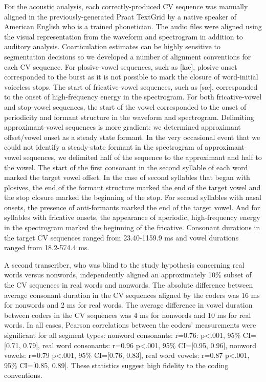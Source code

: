 \documentclass[a4paper,man,natbib,donotrepeattitle, apacite]{apa6}
\begin{document}
For the acoustic analysis, each correctly-produced CV sequence was manually aligned in the previously-generated Praat TextGrid \cite{boersmaPraatDoingPhonetics2018} by a native speaker of American English who is a trained phonetician. The audio files were aligned using the visual representation from the waveform and spectrogram in addition to auditory analysis. Coarticulation estimates can be highly sensitive to segmentation decisions so we developed a number of alignment conventions for each CV sequence. For plosive-vowel sequences, such as [k\ae], plosive onset corresponded to the burst as it is not possible to mark the closure of word-initial voiceless stops. The start of fricative-vowel sequences, such as [s\ae], corresponded to the onset of high-frequency energy in the spectrogram. For both fricative-vowel and stop-vowel sequences, the start of the vowel corresponded to the onset of periodicity and formant structure in the waveform and spectrogram. Delimiting approximant-vowel sequences is more gradient: we determined approximant offset/vowel onset as a steady state formant. In the very occasional event that we could not identify a steady-state formant in the spectrogram of approximant-vowel sequences, we delimited half of the sequence to the approximant and half to the vowel. The start of the first consonant in the second syllable of each word marked the target vowel offset. In the case of second syllables that began with plosives, the end of the formant structure marked the end of the target vowel and the stop closure marked the beginning of the stop. For second syllables with nasal onsets, the presence of anti-formants marked the end of the target vowel. And for syllables with fricative onsets, the appearance of aperiodic, high-frequency energy in the spectrogram marked the beginning of the fricative. Consonant durations in the target CV sequences ranged from 23.40-1159.9 ms and vowel durations ranged from 18.2-574.4 ms.  

A second transcriber, who was blind to the study hypothesis concerning real words versus nonwords, independently aligned an approximately 10\% subset of the CV sequences in real words and nonwords. The absolute difference between average consonant duration in the CV sequences aligned by the coders was 16 ms for nonwords and 2 ms for real words. The average difference in vowel duration between coders in the CV sequences was 4 ms for nonwords and 10 ms for real words. In all cases, Pearson correlations between the coders’ measurements were significant for all segment types: nonword consonants: r=0.76: p<.001, 95\% CI=[0.71, 0.79], real word consonants: r=0.96 p<.001, 95\% CI=[0.95, 0.96], nonword vowels: r=0.79 p<.001, 95\% CI=[0.76, 0.83], real word vowels: r=0.87 p<.001, 95\% CI=[0.85, 0.89]. These statistics suggest high fidelity to the coding conventions. 
\end{document}
